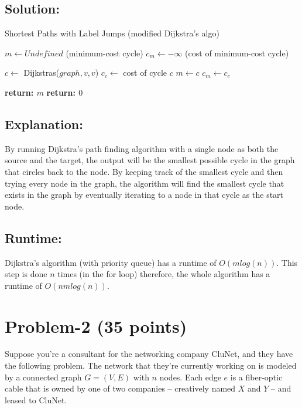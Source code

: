 \documentclass[11pt]{article}
\begin{document}
\subsection*{Solution:}

\begin{algorithm}
    \caption{Shortest Paths with Label Jumps (modified Dijkstra's algo)}
    \begin{algorithmic}[1]
        \STATE $m \gets Undefined$ (minimum-cost cycle)
        \STATE $c_m \gets -\infty$ (cost of minimum-cost cycle)
        
            \STATE $c \gets$ Dijkstras($graph, v, v$)
            \STATE $c_c \gets $ cost of cycle $c$
                \STATE $m \gets c$
                \STATE $c_m \gets c_c$
            \ENDIF
        \ENDFOR
        
        \STATE
            \STATE \textbf{return: $m$}
        \ELSE
            \STATE \textbf{return: $0$}
        \ENDIF
        
    \end{algorithmic}
\end{algorithm}

\subsection*{Explanation:}
By running Dijkstra's path finding algorithm with a single node as both the source and the target, the output will be the smallest possible cycle in the graph that circles back to the node. By keeping track of the smallest cycle and then trying every node in the graph, the algorithm will find the smallest cycle that exists in the graph by eventually iterating to a node in that cycle as the start node.

\subsection*{Runtime:}
Dijkstra's algorithm (with priority queue) has a runtime of $O(mlog(n))$. This step is done $n$ times (in the for loop) therefore, the whole algorithm has a runtime of $O(nmlog(n))$.


\newpage
\section*{Problem-2 (35 points)}

Suppose you're a consultant for the networking company CluNet, and they have the following problem. The network that they're currently working on is modeled by a connected graph $G = (V, E)$ with $n$ nodes. Each edge $e$ is a fiber-optic cable that is owned by one of two companies -- creatively named $X$ and $Y$ -- and leased to CluNet.
\end{document}
